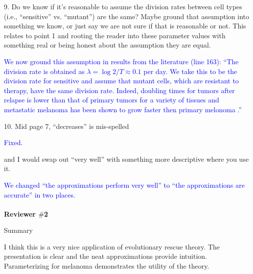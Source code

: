 \documentclass[12pt]{extarticle}
\begin{document}
9. Do we know if it's reasonable to assume the division rates between cell types (i.e., ``sensitive'' vs. ``mutant'') are the same? Maybe ground that assumption into something we know, or just say we are not sure if that is reasonable or not. This relates to point 1 and rooting the reader into these parameter values with something real or being honest about the assumption they are equal.

\textcolor{blue}{ %
We now ground this assumption in results from the literature (line 163): ``The division rate is obtained as $\lambda=\log{2} / T \approx 0.1$ per day. We take this to be the division rate for sensitive and assume that mutant cells, which are resistant to therapy, have the same division rate. Indeed, doubling times for tumors after relapse is lower than that of primary tumors for a variety of tissues \citep{tezuka2007growth,rodgers2024glioblastoma} and metastatic melanoma has been shown to grow faster then primary melonoma \citep{carlson2003tumor}.''
} 

10. Mid page 7, ``decreases'' is mis-spelled 

\textcolor{blue}{%
Fixed. 
} 

and I would swap out ``very well'' with something more descriptive where you use it.

\textcolor{blue}{
We changed ``the approximations perform very well'' to ``the approximations are accurate'' in two places.
} 
\\
\\
\textbf{Reviewer $\#$2}

Summary


I think this is a very nice application of evolutionary rescue theory. The presentation is clear and the neat approximations provide intuition. Parameterizing for melanoma demonstrates the utility of the theory.
\end{document}
